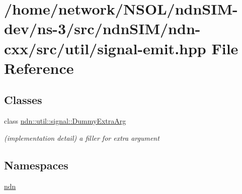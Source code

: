 \hypertarget{signal-emit_8hpp}{}\section{/home/network/\+N\+S\+O\+L/ndn\+S\+I\+M-\/dev/ns-\/3/src/ndn\+S\+I\+M/ndn-\/cxx/src/util/signal-\/emit.hpp File Reference}
\label{signal-emit_8hpp}
\subsection*{Classes}
\begin{DoxyCompactItemize}
\item 
class \hyperlink{classndn_1_1util_1_1signal_1_1DummyExtraArg}{ndn\+::util\+::signal\+::\+Dummy\+Extra\+Arg}
\begin{DoxyCompactList}\small\item\em (implementation detail) a filler for extra argument \end{DoxyCompactList}\end{DoxyCompactItemize}
\subsection*{Namespaces}
\begin{DoxyCompactItemize}
\item 
 \hyperlink{namespacendn}{ndn}
\end{DoxyCompactItemize}
